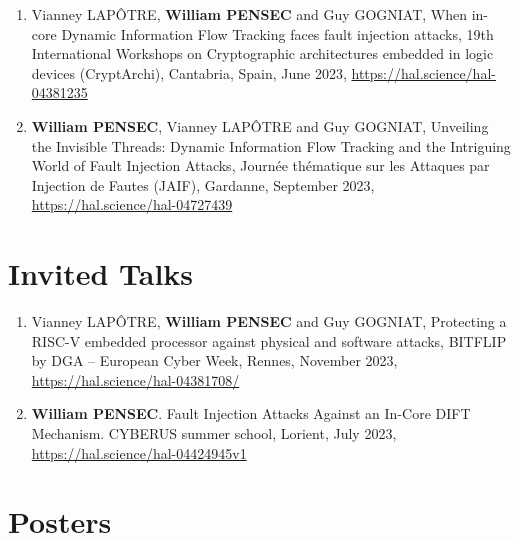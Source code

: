 \begin{enumerate}
    \item Vianney LAPÔTRE, \textbf{William PENSEC} and Guy GOGNIAT, When in-core Dynamic Information Flow Tracking faces fault injection attacks, 19th International Workshops on Cryptographic architectures embedded in logic devices (CryptArchi), Cantabria, Spain, June 2023, \url{https://hal.science/hal-04381235}
    \item \textbf{William PENSEC}, Vianney LAPÔTRE and Guy GOGNIAT, Unveiling the Invisible Threads: Dynamic Information Flow Tracking and the Intriguing World of Fault Injection Attacks, Journée thématique sur les Attaques par Injection de Fautes (JAIF), Gardanne, September 2023, \url{https://hal.science/hal-04727439}
\end{enumerate}
\section{Invited Talks}

\begin{enumerate}
    \item Vianney LAPÔTRE, \textbf{William PENSEC} and Guy GOGNIAT, Protecting a RISC-V embedded processor against physical and software attacks, BITFLIP by DGA -- European Cyber Week, Rennes, November 2023, \url{https://hal.science/hal-04381708/}
    \item \textbf{William PENSEC}. Fault Injection Attacks Against an In-Core DIFT Mechanism. CYBERUS summer school, Lorient, July 2023, \url{https://hal.science/hal-04424945v1}
\end{enumerate}
\section{Posters}

